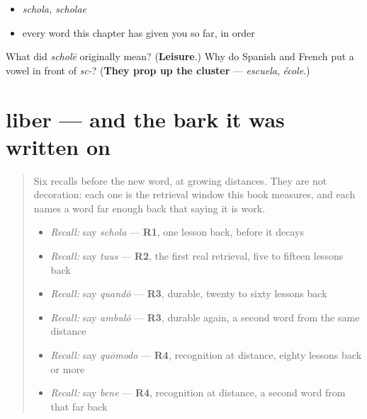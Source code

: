 \begin{itemize}
\raggedright
  \item \emph{schola, scholae}
  \item every word this chapter has given you so far, in order
\end{itemize}

\begin{tcolorbox}[breakable,colback=teal!4,colframe=teal!35!black,title={Before you move on}]
What did \emph{scholē} originally mean? (\textbf{Leisure}.) Why do Spanish and French put a vowel in front of \emph{sc-}? (\textbf{They prop up the cluster} — \emph{escuela}, \emph{école}.)
\end{tcolorbox}
\section[liber, librī]{liber — and the bark it was written on}

\label{lesson:LA-C53-liber}



\begin{quote}
Six recalls before the new word, at growing distances. They are not decoration: each one is the retrieval window this book measures, and each names a word far enough back that saying it is work.

\begin{itemize}
\raggedright
  \item \emph{Recall:} say \emph{schola} — \textbf{R1}, one lesson back, before it decays
  \item \emph{Recall:} say \emph{tuus} — \textbf{R2}, the first real retrieval, five to fifteen lessons back
  \item \emph{Recall:} say \emph{quandō} — \textbf{R3}, durable, twenty to sixty lessons back
  \item \emph{Recall:} say \emph{ambulō} — \textbf{R3}, durable again, a second word from the same distance
  \item \emph{Recall:} say \emph{quōmodo} — \textbf{R4}, recognition at distance, eighty lessons back or more
  \item \emph{Recall:} say \emph{bene} — \textbf{R4}, recognition at distance, a second word from that far back
\end{itemize}
\end{quote}

